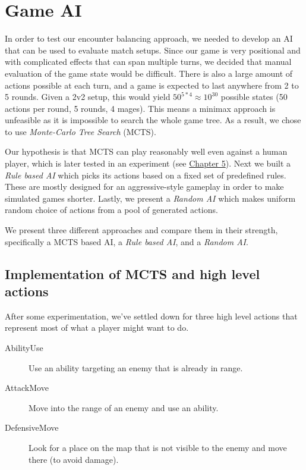 \chapter{Game AI}
\label{chapter03}

In order to test our encounter balancing approach, we needed to develop an
AI that can be used to evaluate match setups. Since our game is very
positional and with complicated effects that can span multiple turns, we
decided that manual evaluation of the game state would be difficult. There
is also a large amount of actions possible at each turn, and a game is expected
to last anywhere from 2 to 5 rounds. Given a 2v2 setup, this would yield
$50^{5*4} \approx 10^{30}$ possible states (50 actions per round, 5 rounds, 4 mages).
This means a minimax approach is unfeasible as it is impossible to search the whole
game tree. As a result, we chose to use \emph{Monte-Carlo Tree Search} (MCTS).

Our hypothesis is that MCTS can play reasonably well even against a human player,
which is later tested in an experiment (see \hyperref[chapter05]{Chapter 5}).
Next we built a \emph{Rule based AI} which picks
its actions based on a fixed set of predefined rules. These are mostly
designed for an aggressive-style gameplay in order to make simulated games
shorter. Lastly, we present a \emph{Random AI} which makes uniform random
choice of actions from a pool of generated actions.


We present three different approaches and compare them in their strength,
specifically a MCTS based AI, a \emph{Rule based AI}, and a \emph{Random
	AI}.

\section{Implementation of MCTS and high level actions}

After some experimentation, we've settled down for three high level actions
that represent most of what a player might want to do.

\begin{description}
\item [AbilityUse] Use an ability targeting an enemy that is already in range.
\item [AttackMove] Move into the range of an enemy and use an ability.
\item [DefensiveMove] Look for a place on the map that is not visible to the enemy and move there (to avoid damage).
\end{description}

